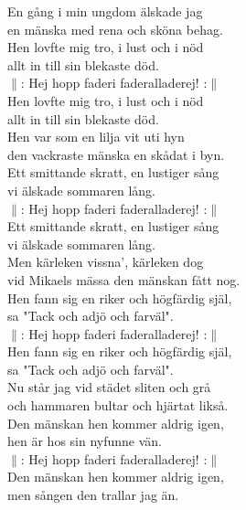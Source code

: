 \documentclass[a6paper, 10pt, twoside]{article}
\begin{document}
\begin{center}
\end{center}
\begin{lyrics}
En gång i min ungdom älskade jag\\
en mänska med rena och sköna behag.\\
Hen lovfte mig tro, i lust och i nöd\\
allt in till sin blekaste död.
\vspace{4pt}\\
$\|$: Hej hopp faderi faderalladerej! :$\|$\\
Hen lovfte mig tro, i lust och i nöd\\
allt in till sin blekaste död.
\vspace{4pt}\\
Hen var som en lilja vit uti hyn\\
den vackraste mänska en skådat i byn.\\
Ett smittande skratt, en lustiger sång\\
vi älskade sommaren lång.
\vspace{4pt}\\
$\|$: Hej hopp faderi faderalladerej! :$\|$\\
Ett smittande skratt, en lustiger sång\\
vi älskade sommaren lång.
\vspace{4pt}\\
Men kärleken vissna', kärleken dog\\
vid Mikaels mässa den mänskan fått nog.\\
Hen fann sig en riker och högfärdig själ,\\
sa "Tack och adjö och farväl".
\vspace{4pt}\\
$\|$: Hej hopp faderi faderalladerej! :$\|$\\
Hen fann sig en riker och högfärdig själ,\\
sa "Tack och adjö och farväl".
\vspace{4pt}\\
Nu står jag vid städet sliten och grå\\
och hammaren bultar och hjärtat likså.\\
Den mänskan hen kommer aldrig igen,\\
hen är hos sin nyfunne vän.
\vspace{4pt}\\
$\|$: Hej hopp faderi faderalladerej! :$\|$\\
Den mänskan hen kommer aldrig igen,\\
men sången den trallar jag än. 
\end{lyrics}
\end{document}

